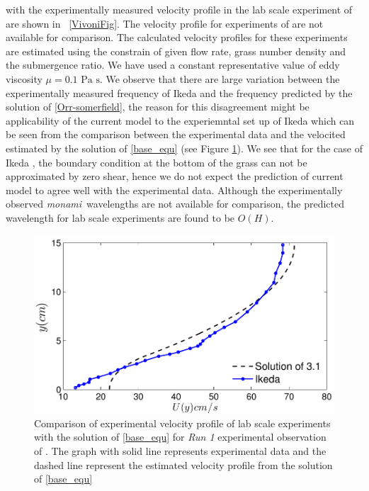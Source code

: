 \documentclass[12pt]{report}   %
\newcommand{\monami}{\textit{monami}}
\begin{document}
with the experimentally measured velocity profile in the lab scale experiment of \cite{Vivoni98} are shown in ~\ref{VivoniFig}. The velocity profile for experiments of \cite{Ghisal02} are not available for comparison. The calculated velocity profiles for these experiments are estimated using the constrain of given flow rate, grass number density and the submergence ratio. We have used a constant representative value of eddy viscosity $\mu =  \text{0.1 Pa s}$. We observe that there are large variation between the experimentally measured frequency of Ikeda \cite{Ikeda96} and the  frequency predicted by the solution of \ref{Orr-somerfield}, the reason for this disagreement might be applicability of the current model to the experiemntal set up of Ikeda \cite{Ikeda96} which can be seen from the comparison between the experimental data and the velocited estimated by the solution of \ref{base_equ} (see Figure \ref{IkedaMatching}). We see that for the case of Ikeda \cite{Ikeda96}, the boundary condition at the bottom of the grass can not be approximated by zero shear, hence we do not expect the prediction of current model to agree well with the experimental data.
Although the experimentally observed \monami ~wavelengths are not available for comparison, the predicted wavelength for lab scale experiments \citep{Ghisal02} are found to be $O(H)$.
\begin{figure}
 \includegraphics{Ikeda_zero_shear_match}
 \caption{ Comparison of experimental velocity profile of lab scale experiments with the solution of \eqref{base_equ} for \textit{Run 1 } experimental observation of \cite{Ikeda96}. The graph with solid line represents experimental data and the dashed line represent the estimated velocity profile from the solution of \eqref{base_equ}    }
 \label{IkedaMatching}
\end{figure}
\end{document}
